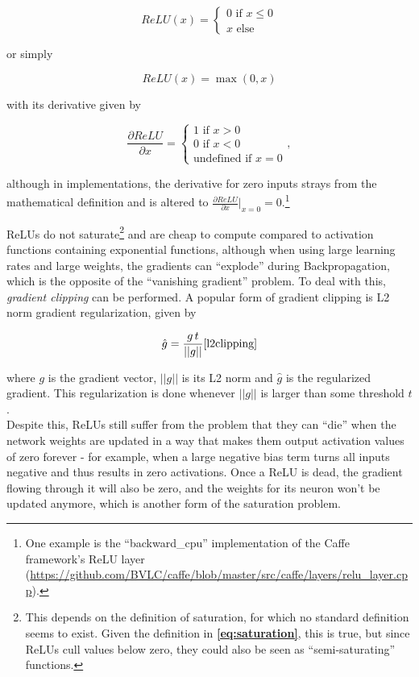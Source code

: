 \[  ReLU(x) = \begin{cases}
			0 \text{ if } x \leq 0\\
			x \text{ else}
		 \end{cases}
\] 

\noindent or simply

\[ ReLU(x) = \max(0, x) \]

\noindent with its derivative given by 

\[ \frac{\partial ReLU}{\partial x} = \begin{cases}
							1 \text { if } x > 0\\
							0 \text { if } x < 0\\
							 \text{undefined if } x = 0
						        \end{cases},
\]

\noindent although in implementations, the derivative for zero inputs strays from the mathematical definition and is altered to $\frac{\partial ReLU}{\partial x}\rvert_{x=0} = 0$.\footnote{One example is the ``backward\_cpu'' implementation of the Caffe framework's ReLU layer (\url{https://github.com/BVLC/caffe/blob/master/src/caffe/layers/relu_layer.cpp}).}

ReLUs do not saturate\footnote{This depends on the definition of saturation, for which no standard definition seems to exist. Given the definition in \textbf{\ref{eq:saturation}}, this is true, but since ReLUs cull values below zero, they could also be seen as ``semi-saturating'' functions.} and are cheap to compute compared to activation functions containing exponential functions, although when using large learning rates and large weights, the gradients can ``explode'' during Backpropagation, which is the opposite of the ``vanishing gradient'' problem. To deal with this, \textit{gradient clipping} can be performed. A popular form of gradient clipping is L2 norm gradient regularization, given by

\[ \hat{g} = \frac{g\,t}{||g||} \cite{l2clipping} \]

\noindent where $g$ is the gradient vector, $||g||$ is its L2 norm and $\hat{g}$ is the regularized gradient. This regularization is done whenever $||g||$ is larger than some threshold $t$.\\

\noindent Despite this, ReLUs still suffer from the problem that they can ``die'' when the network weights are updated in a way that makes them output activation values of zero forever - for example, when a large negative bias term turns all inputs negative and thus results in zero activations. Once a ReLU is dead, the gradient flowing through it will also be zero, and the weights for its neuron won't be updated anymore, which is another form of the saturation problem.

